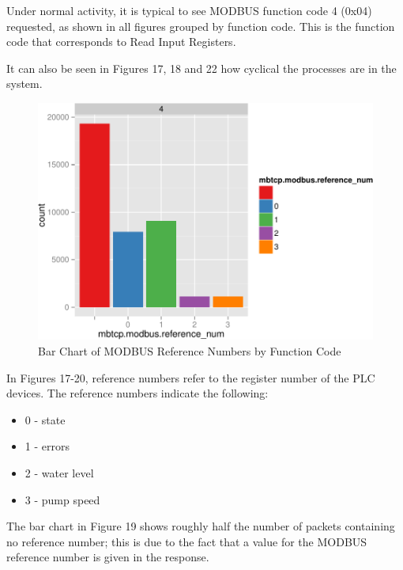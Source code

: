 \documentclass[11pt,a4paper]{article}
\begin{document}
\clearpage

Under normal activity, it is typical to see MODBUS function code 4
(0x04) requested, as shown in all figures grouped by function code. This
is the function code that corresponds to Read Input Registers.

It can also be seen in Figures 17, 18 and 22 how cyclical the processes
are in the system.

\begin{figure}[h]

{\centering \includegraphics{thesis_files/figure-latex/unnamed-chunk-31-1} 

}

\caption{Bar Chart of MODBUS Reference Numbers by Function Code}\label{fig:unnamed-chunk-31}
\end{figure}

In Figures 17-20, reference numbers refer to the register number of the
PLC devices. The reference numbers indicate the following:

\begin{itemize}
\itemsep1pt\parskip0pt
\item
  0 - state
\item
  1 - errors
\item
  2 - water level
\item
  3 - pump speed
\end{itemize}

The bar chart in Figure 19 shows roughly half the number of packets
containing no reference number; this is due to the fact that a value for
the MODBUS reference number is given in the response.
\end{document}
